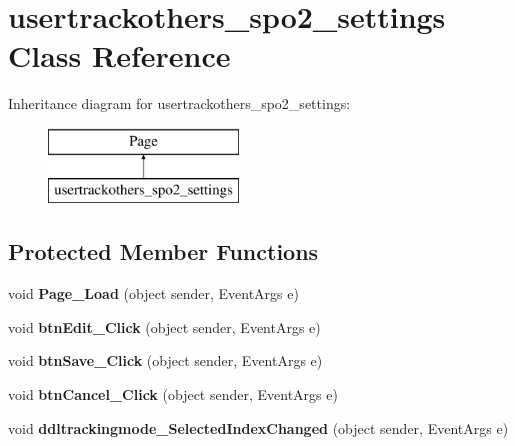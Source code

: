 \hypertarget{classusertrackothers__spo2__settings}{\section{usertrackothers\-\_\-spo2\-\_\-settings Class Reference}
\label{classusertrackothers__spo2__settings}
}
Inheritance diagram for usertrackothers\-\_\-spo2\-\_\-settings\-:\begin{figure}[H]
\begin{center}
\leavevmode
\includegraphics[height=2.000000cm]{classusertrackothers__spo2__settings}
\end{center}
\end{figure}
\subsection*{Protected Member Functions}
\begin{DoxyCompactItemize}
\item 
\hypertarget{classusertrackothers__spo2__settings_aad3d6f1b3ab0c3f324c3013d4e50de53}{void {\bfseries Page\-\_\-\-Load} (object sender, Event\-Args e)}\label{classusertrackothers__spo2__settings_aad3d6f1b3ab0c3f324c3013d4e50de53}

\item 
\hypertarget{classusertrackothers__spo2__settings_ad2033b8ab847d21e9bc9f091faded08c}{void {\bfseries btn\-Edit\-\_\-\-Click} (object sender, Event\-Args e)}\label{classusertrackothers__spo2__settings_ad2033b8ab847d21e9bc9f091faded08c}

\item 
\hypertarget{classusertrackothers__spo2__settings_aaf1ed7fe5868adb2eafebbddd5315123}{void {\bfseries btn\-Save\-\_\-\-Click} (object sender, Event\-Args e)}\label{classusertrackothers__spo2__settings_aaf1ed7fe5868adb2eafebbddd5315123}

\item 
\hypertarget{classusertrackothers__spo2__settings_aa753d2b432887f7cbc0e72429698805b}{void {\bfseries btn\-Cancel\-\_\-\-Click} (object sender, Event\-Args e)}\label{classusertrackothers__spo2__settings_aa753d2b432887f7cbc0e72429698805b}

\item 
\hypertarget{classusertrackothers__spo2__settings_abf09aa9c3bd7b1ddd7894b14996d58aa}{void {\bfseries ddltrackingmode\-\_\-\-Selected\-Index\-Changed} (object sender, Event\-Args e)}\label{classusertrackothers__spo2__settings_abf09aa9c3bd7b1ddd7894b14996d58aa}

\end{DoxyCompactItemize}


